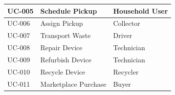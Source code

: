 \begin{longtable}{|p{2.5cm}|p{6cm}|p{4cm}|}
UC-005

&

Schedule Pickup

&

Household User

\\

\hline

UC-006

&

Assign Pickup

&

Collector

\\

\hline

UC-007

&

Transport Waste

&

Driver

\\

\hline

UC-008

&

Repair Device

&

Technician

\\

\hline

UC-009

&

Refurbish Device

&

Technician

\\

\hline

UC-010

&

Recycle Device

&

Recycler

\\

\hline

UC-011

&

Marketplace Purchase

&

Buyer

\\

\hline


\end{longtable}
